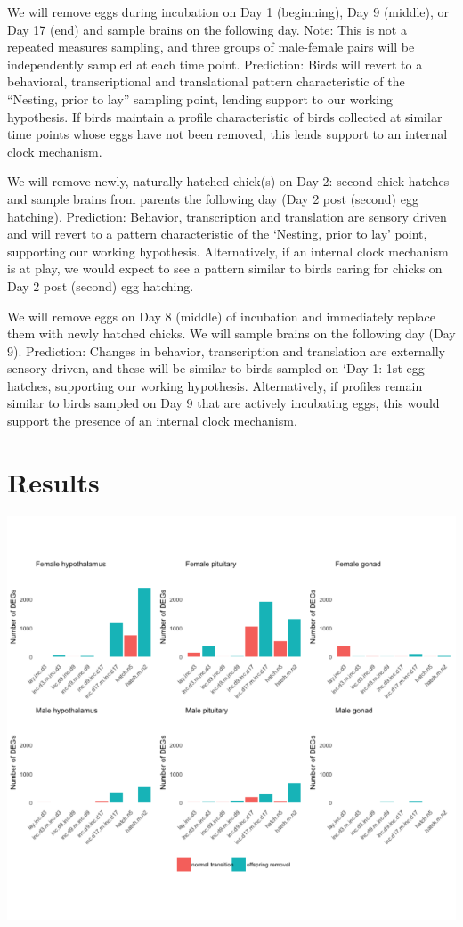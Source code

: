 \documentclass[10pt,letterpaper]{article}
\begin{document}
We will remove eggs during incubation on Day 1 (beginning), Day 9
(middle), or Day 17 (end) and sample brains on the following day. Note:
This is not a repeated measures sampling, and three groups of
male-female pairs will be independently sampled at each time point.
Prediction: Birds will revert to a behavioral, transcriptional and
translational pattern characteristic of the ``Nesting, prior to lay''
sampling point, lending support to our working hypothesis. If birds
maintain a profile characteristic of birds collected at similar time
points whose eggs have not been removed, this lends support to an
internal clock mechanism.

We will remove newly, naturally hatched chick(s) on Day 2: second chick
hatches and sample brains from parents the following day (Day 2 post
(second) egg hatching). Prediction: Behavior, transcription and
translation are sensory driven and will revert to a pattern
characteristic of the `Nesting, prior to lay' point, supporting our
working hypothesis. Alternatively, if an internal clock mechanism is at
play, we would expect to see a pattern similar to birds caring for
chicks on Day 2 post (second) egg hatching.

We will remove eggs on Day 8 (middle) of incubation and immediately
replace them with newly hatched chicks. We will sample brains on the
following day (Day 9). Prediction: Changes in behavior, transcription
and translation are externally sensory driven, and these will be similar
to birds sampled on `Day 1: 1st egg hatches, supporting our working
hypothesis. Alternatively, if profiles remain similar to birds sampled
on Day 9 that are actively incubating eggs, this would support the
presence of an internal clock mechanism.

\hypertarget{results}{%
\section{Results}\label{results}}

\includegraphics{manipulation_manuscript_files/figure-latex/unnamed-chunk-2-1.pdf}
\end{document}
